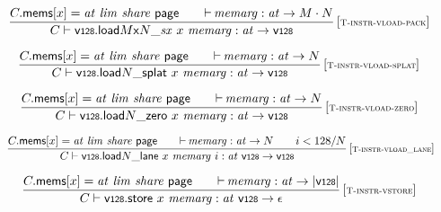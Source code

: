 $$
\begin{array}{@{}c@{}}\displaystyle
\frac{
C{.}\mathsf{mems}{}[x] = {\mathit{at}}~{\mathit{lim}}~{\mathit{share}}~\mathsf{page}
 \qquad
{\vdash}\, {\mathit{memarg}} : {\mathit{at}} \rightarrow M \cdot N
}{
C \vdash {\mathsf{v{\scriptstyle 128}}{.}\mathsf{load}}{{M}{\mathsf{x}}{N}{\mathsf{\_}}{{\mathit{sx}}}}~x~{\mathit{memarg}} : {\mathit{at}} \rightarrow \mathsf{v{\scriptstyle 128}}
} \, {[\textsc{\scriptsize T{-}instr{-}vload{-}pack}]}
\qquad
\end{array}
$$

$$
\begin{array}{@{}c@{}}\displaystyle
\frac{
C{.}\mathsf{mems}{}[x] = {\mathit{at}}~{\mathit{lim}}~{\mathit{share}}~\mathsf{page}
 \qquad
{\vdash}\, {\mathit{memarg}} : {\mathit{at}} \rightarrow N
}{
C \vdash {\mathsf{v{\scriptstyle 128}}{.}\mathsf{load}}{{N}{\mathsf{\_}}{\mathsf{splat}}}~x~{\mathit{memarg}} : {\mathit{at}} \rightarrow \mathsf{v{\scriptstyle 128}}
} \, {[\textsc{\scriptsize T{-}instr{-}vload{-}splat}]}
\qquad
\end{array}
$$

$$
\begin{array}{@{}c@{}}\displaystyle
\frac{
C{.}\mathsf{mems}{}[x] = {\mathit{at}}~{\mathit{lim}}~{\mathit{share}}~\mathsf{page}
 \qquad
{\vdash}\, {\mathit{memarg}} : {\mathit{at}} \rightarrow N
}{
C \vdash {\mathsf{v{\scriptstyle 128}}{.}\mathsf{load}}{{N}{\mathsf{\_}}{\mathsf{zero}}}~x~{\mathit{memarg}} : {\mathit{at}} \rightarrow \mathsf{v{\scriptstyle 128}}
} \, {[\textsc{\scriptsize T{-}instr{-}vload{-}zero}]}
\qquad
\end{array}
$$

$$
\begin{array}{@{}c@{}}\displaystyle
\frac{
C{.}\mathsf{mems}{}[x] = {\mathit{at}}~{\mathit{lim}}~{\mathit{share}}~\mathsf{page}
 \qquad
{\vdash}\, {\mathit{memarg}} : {\mathit{at}} \rightarrow N
 \qquad
i < 128 / N
}{
C \vdash {\mathsf{v{\scriptstyle 128}}{.}\mathsf{load}}{N}{\mathsf{\_}}{\mathsf{lane}}~x~{\mathit{memarg}}~i : {\mathit{at}}~\mathsf{v{\scriptstyle 128}} \rightarrow \mathsf{v{\scriptstyle 128}}
} \, {[\textsc{\scriptsize T{-}instr{-}vload\_lane}]}
\qquad
\end{array}
$$

$$
\begin{array}{@{}c@{}}\displaystyle
\frac{
C{.}\mathsf{mems}{}[x] = {\mathit{at}}~{\mathit{lim}}~{\mathit{share}}~\mathsf{page}
 \qquad
{\vdash}\, {\mathit{memarg}} : {\mathit{at}} \rightarrow {|\mathsf{v{\scriptstyle 128}}|}
}{
C \vdash \mathsf{v{\scriptstyle 128}}{.}\mathsf{store}~x~{\mathit{memarg}} : {\mathit{at}}~\mathsf{v{\scriptstyle 128}} \rightarrow \epsilon
} \, {[\textsc{\scriptsize T{-}instr{-}vstore}]}
\qquad
\end{array}
$$

